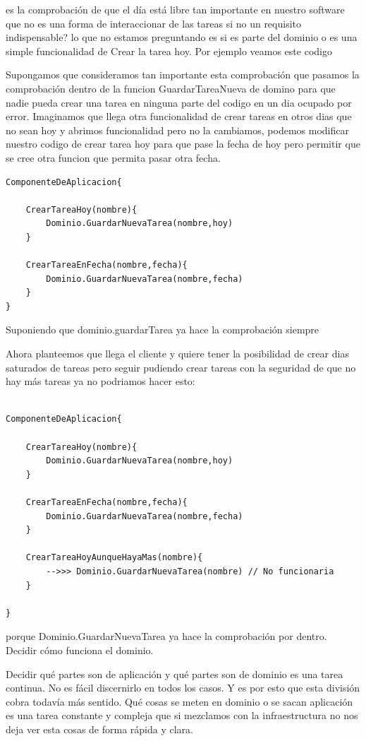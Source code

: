 es la comprobación de que el día está libre tan importante en nuestro software que no es una forma de interaccionar de las tareas
si no un requisito indispensable? lo que no estamos preguntando es si es parte del dominio o es una simple funcionalidad de Crear la tarea hoy. Por ejemplo veamos este codigo

Supongamos que consideramos tan importante esta comprobación que pasamos la comprobación dentro de la funcion GuardarTareaNueva de domino para que nadie pueda crear una tarea en ninguna parte del codigo en un dia ocupado por error. Imaginamos que llega otra funcionalidad de crear tareas en otros dias que no sean hoy y abrimos funcionalidad pero no la cambiamos, podemos modificar nuestro codigo de crear tarea hoy para que pase la fecha de hoy pero permitir que se cree otra funcion que permita pasar otra fecha.

\begin{verbatim}
ComponenteDeAplicacion{

    CrearTareaHoy(nombre){
        Dominio.GuardarNuevaTarea(nombre,hoy)
    }

    CrearTareaEnFecha(nombre,fecha){
        Dominio.GuardarNuevaTarea(nombre,fecha)
    }
}

\end{verbatim}

Suponiendo que dominio.guardarTarea ya hace la comprobación siempre


Ahora planteemos que llega el cliente y quiere tener la posibilidad de crear dias saturados de tareas pero seguir pudiendo crear tareas con la seguridad de que no hay más tareas ya no podriamos hacer esto:

\begin{verbatim}

ComponenteDeAplicacion{

    CrearTareaHoy(nombre){
        Dominio.GuardarNuevaTarea(nombre,hoy)
    }

    CrearTareaEnFecha(nombre,fecha){
        Dominio.GuardarNuevaTarea(nombre,fecha)
    }

    CrearTareaHoyAunqueHayaMas(nombre){
        -->>> Dominio.GuardarNuevaTarea(nombre) // No funcionaria
    }

}
\end{verbatim}

porque Dominio.GuardarNuevaTarea ya hace la comprobación por dentro. Decidir cómo funciona el dominio.

Decidir qué partes son de aplicación y qué partes son de dominio es una tarea continua. No es fácil discernirlo en todos los casos. Y es por esto que esta división cobra todavía más sentido. Qué cosas se meten en dominio o se sacan aplicación es una tarea constante y compleja que si mezclamos con la infraestructura no nos deja ver esta cosas de forma rápida y clara.

